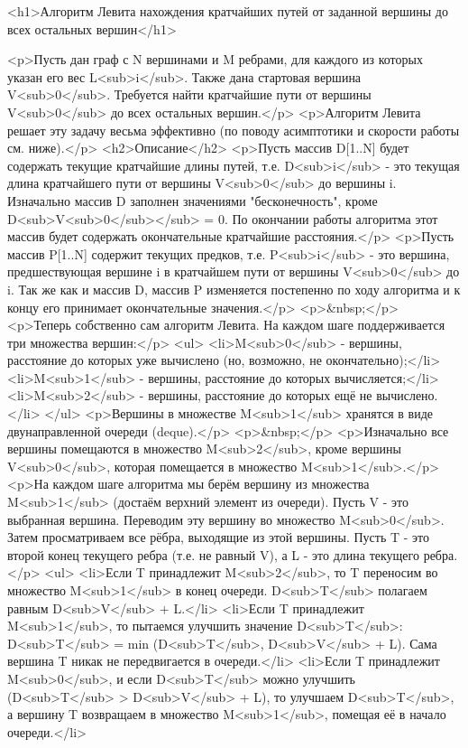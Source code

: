 <h1>Алгоритм Левита нахождения кратчайших путей от заданной вершины до всех остальных вершин</h1>

<p>Пусть дан граф с N вершинами и M ребрами, для каждого из которых указан его вес L<sub>i</sub>. Также дана стартовая вершина V<sub>0</sub>. Требуется найти кратчайшие пути от вершины V<sub>0</sub> до всех остальных вершин.</p>
<p>Алгоритм Левита решает эту задачу весьма эффективно (по поводу асимптотики и скорости работы см. ниже).</p>
<h2>Описание</h2>
<p>Пусть массив D[1..N] будет содержать текущие кратчайшие длины путей, т.е. D<sub>i</sub> - это текущая длина кратчайшего пути от вершины V<sub>0</sub> до вершины i. Изначально массив D заполнен значениями "бесконечность", кроме D<sub>V<sub>0</sub></sub> = 0. По окончании работы алгоритма этот массив будет содержать окончательные кратчайшие расстояния.</p>
<p>Пусть массив P[1..N] содержит текущих предков, т.е. P<sub>i</sub> - это вершина, предшествующая вершине i в кратчайшем пути от вершины V<sub>0</sub> до i. Так же как и массив D, массив P изменяется постепенно по ходу алгоритма и к концу его принимает окончательные значения.</p>
<p>&nbsp;</p>
<p>Теперь собственно сам алгоритм Левита. На каждом шаге поддерживается три множества вершин:</p>
<ul>
<li>M<sub>0</sub> - вершины, расстояние до которых уже вычислено (но, возможно, не окончательно);</li>
<li>M<sub>1</sub> - вершины, расстояние до которых вычисляется;</li>
<li>M<sub>2</sub> - вершины, расстояние до которых ещё не вычислено.</li>
</ul>
<p>Вершины в множестве M<sub>1</sub> хранятся в виде двунаправленной очереди (deque).</p>
<p>&nbsp;</p>
<p>Изначально все вершины помещаются в множество M<sub>2</sub>, кроме вершины V<sub>0</sub>, которая помещается в множество M<sub>1</sub>.</p>
<p>На каждом шаге алгоритма мы берём вершину из множества M<sub>1</sub> (достаём верхний элемент из очереди). Пусть V - это выбранная вершина. Переводим эту вершину во множество M<sub>0</sub>. Затем просматриваем все рёбра, выходящие из этой вершины. Пусть T - это второй конец текущего ребра (т.е. не равный V), а L - это длина текущего ребра.</p>
<ul>
<li>Если T принадлежит M<sub>2</sub>, то T переносим во множество M<sub>1</sub> в конец очереди. D<sub>T</sub> полагаем равным D<sub>V</sub> + L.</li>
<li>Если T принадлежит M<sub>1</sub>, то пытаемся улучшить значение D<sub>T</sub>: D<sub>T</sub> = min (D<sub>T</sub>, D<sub>V</sub> + L). Сама вершина T никак не передвигается в очереди.</li>
<li>Если T принадлежит M<sub>0</sub>, и если D<sub>T</sub> можно улучшить (D<sub>T</sub> > D<sub>V</sub> + L), то улучшаем D<sub>T</sub>, а вершину T возвращаем в множество M<sub>1</sub>, помещая её в начало очереди.</li>

